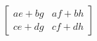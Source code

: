 \documentclass[preview]{standalone}
\begin{document}
\begin{align*}
\begin{bmatrix} ae + bg & af + bh \\ ce + dg & cf + dh \end{bmatrix}
\end{align*}
\end{document}
